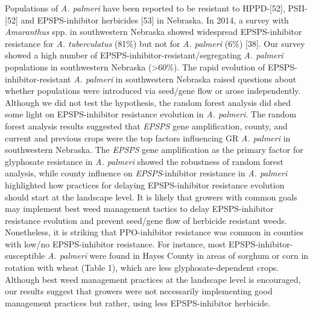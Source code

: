 \documentclass[10pt,letterpaper]{article}
\begin{document}
Populations of \emph{A. palmeri} have been reported to be resistant to
HPPD-{[}52{]}, PSII-{[}52{]} and EPSPS-inhibitor herbicides {[}53{]} in
Nebraska. In 2014, a survey with \emph{Amaranthus} spp. in southwestern
Nebraska showed widespread EPSPS-inhibitor resistance for \emph{A.
tuberculatus} (81\%) but not for \emph{A. palmeri} (6\%) {[}38{]}. Our
survey showed a high number of EPSPS-inhibitor-resistant/segregating
\emph{A. palmeri} populations in southwestern Nebraska
(\textgreater60\%). The rapid evolution of EPSPS-inhibitor-resistant
\emph{A. palmeri} in southwestern Nebraska raised questions about
whether populations were introduced via seed/gene flow or arose
independently. Although we did not test the hypothesis, the random
forest analysis did shed some light on EPSPS-inhibitor resistance
evolution in \emph{A. palmeri}. The random forest analysis results
suggested that \emph{EPSPS} gene amplification, county, and current and
previous crops were the top factors influencing GR \emph{A. palmeri} in
southwestern Nebraska. The \emph{EPSPS} gene amplification as the
primary factor for glyphosate resistance in \emph{A. palmeri} showed the
robustness of random forest analysis, while county influence on
\emph{EPSPS}-inhibitor resistance in \emph{A. palmeri} highlighted how
practices for delaying EPSPS-inhibitor resistance evolution should start
at the landscape level. It is likely that growers with common goals may
implement best weed management tactics to delay EPSPS-inhibitor
resistance evolution and prevent seed/gene flow of herbicide resistant
weeds. Nonetheless, it is striking that PPO-inhibitor resistance was
common in counties with low/no EPSPS-inhibitor resistance. For instance,
most EPSPS-inhibitor-susceptible \emph{A. palmeri} were found in Hayes
County in areas of sorghum or corn in rotation with wheat (Table 1),
which are less glyphosate-dependent crops. Although best weed management
practices at the landscape level is encouraged, our results suggest that
growers were not necessarily implementing good management practices but
rather, using less EPSPS-inhibitor herbicide.
\end{document}

